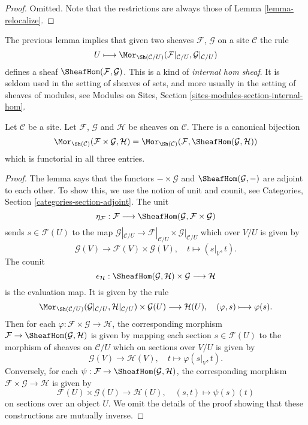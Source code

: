 \begin{proof}
Omitted. Note that the restrictions are always those of
Lemma \ref{lemma-relocalize}.
\end{proof}

\noindent
The previous lemma implies that given two sheaves $\mathcal{F}$,
$\mathcal{G}$ on a site $\mathcal{C}$ the rule
$$
U \longmapsto
\Mor_{\Sh(\mathcal{C}/U)}(
\mathcal{F}|_{\mathcal{C}/U}, \mathcal{G}|_{\mathcal{C}/U})
$$
defines a sheaf $\SheafHom(\mathcal{F},\mathcal{G})$.
This is a kind of {\it internal hom sheaf}. It is
seldom used in the setting of sheaves of sets, and more usually
in the setting of sheaves of modules, see
Modules on Sites, Section \ref{sites-modules-section-internal-hom}.

\begin{lemma}
\label{lemma-internal-hom-sheaf}
Let $\mathcal{C}$ be a site. Let $\mathcal{F}$, $\mathcal{G}$ and
$\mathcal{H}$ be sheaves on $\mathcal{C}$. There is a canonical bijection
$$
\Mor_{\Sh(\mathcal{C})}(\mathcal{F}\times\mathcal{G},\mathcal{H}) =
\Mor_{\Sh(\mathcal{C})}(\mathcal{F},\SheafHom(\mathcal{G},\mathcal{H}))
$$
which is functorial in all three entries.
\end{lemma}

\begin{proof}
The lemma says that the functors $-\times\mathcal{G}$ and
$\SheafHom(\mathcal{G},-)$ are adjoint to each other. 
To show this, we use the notion of unit and counit, see
Categories, Section \ref{categories-section-adjoint}.
The unit
$$
\eta_\mathcal{F} :
\mathcal{F}
\longrightarrow
\SheafHom(\mathcal{G},\mathcal{F}\times\mathcal{G})
$$
sends $s \in \mathcal{F}(U)$ to the map
$\mathcal{G}|_{\mathcal{C}/U} \to
\mathcal{F}|_{\mathcal{C}/U}\times\mathcal{G}|_{\mathcal{C}/U}$
which over $V/U$ is given by
$$
\mathcal{G}(V) \longrightarrow \mathcal{F}(V)\times \mathcal{G}(V), \quad
t \longmapsto (s|_{V},t).
$$
The counit
$$
\epsilon_{\mathcal{H}} :
\SheafHom(\mathcal{G}, \mathcal{H}) \times \mathcal{G}
\longrightarrow
\mathcal{H}
$$
is the evaluation map. It is given by the rule
$$
\Mor_{\Sh(\mathcal{C}/U)}(
\mathcal{G}|_{\mathcal{C}/U}, \mathcal{H}|_{\mathcal{C}/U})
\times \mathcal{G}(U)
\longrightarrow
\mathcal{H}(U),\quad
(\varphi, s) \longmapsto \varphi(s).
$$
Then for each $\varphi : \mathcal{F} \times \mathcal{G} \to \mathcal{H}$,
the corresponding morphism
$\mathcal{F} \to \SheafHom(\mathcal{G},\mathcal{H})$
is given by mapping each section $s \in \mathcal{F}(U)$
to the morphism of sheaves on $\mathcal{C}/U$ which on
sections over $V/U$ is given by
$$
\mathcal{G}(V) \longrightarrow \mathcal{H}(V),\quad
t \longmapsto \varphi(s|_V, t).
$$
Conversely, for each
$\psi : \mathcal{F} \to \SheafHom(\mathcal{G}, \mathcal{H})$,
the corresponding morphism
$\mathcal{F} \times \mathcal{G} \to \mathcal{H}$ is given by
$$
\mathcal{F}(U) \times \mathcal{G}(U) \longrightarrow \mathcal{H}(U),\quad
(s, t) \longmapsto \psi(s)(t)
$$
on sections over an object $U$. We omit the details of the proof showing
that these constructions are mutually inverse.
\end{proof}

